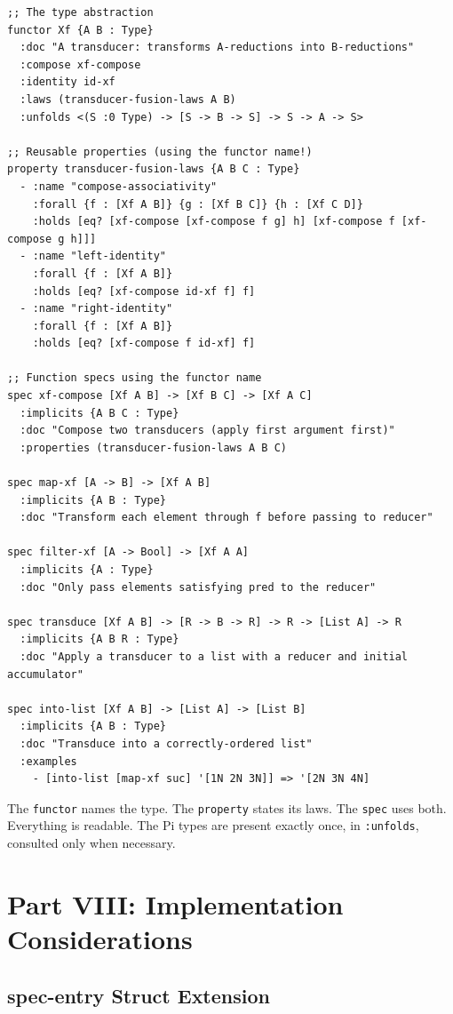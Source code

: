 \documentclass[11pt]{article}
\begin{document}
\begin{verbatim}
;; The type abstraction
functor Xf {A B : Type}
  :doc "A transducer: transforms A-reductions into B-reductions"
  :compose xf-compose
  :identity id-xf
  :laws (transducer-fusion-laws A B)
  :unfolds <(S :0 Type) -> [S -> B -> S] -> S -> A -> S>

;; Reusable properties (using the functor name!)
property transducer-fusion-laws {A B C : Type}
  - :name "compose-associativity"
    :forall {f : [Xf A B]} {g : [Xf B C]} {h : [Xf C D]}
    :holds [eq? [xf-compose [xf-compose f g] h] [xf-compose f [xf-compose g h]]]
  - :name "left-identity"
    :forall {f : [Xf A B]}
    :holds [eq? [xf-compose id-xf f] f]
  - :name "right-identity"
    :forall {f : [Xf A B]}
    :holds [eq? [xf-compose f id-xf] f]

;; Function specs using the functor name
spec xf-compose [Xf A B] -> [Xf B C] -> [Xf A C]
  :implicits {A B C : Type}
  :doc "Compose two transducers (apply first argument first)"
  :properties (transducer-fusion-laws A B C)

spec map-xf [A -> B] -> [Xf A B]
  :implicits {A B : Type}
  :doc "Transform each element through f before passing to reducer"

spec filter-xf [A -> Bool] -> [Xf A A]
  :implicits {A : Type}
  :doc "Only pass elements satisfying pred to the reducer"

spec transduce [Xf A B] -> [R -> B -> R] -> R -> [List A] -> R
  :implicits {A B R : Type}
  :doc "Apply a transducer to a list with a reducer and initial accumulator"

spec into-list [Xf A B] -> [List A] -> [List B]
  :implicits {A B : Type}
  :doc "Transduce into a correctly-ordered list"
  :examples
    - [into-list [map-xf suc] '[1N 2N 3N]] => '[2N 3N 4N]
\end{verbatim}

The \texttt{functor} names the type. The \texttt{property} states its laws. The \texttt{spec} uses
both. Everything is readable. The Pi types are present exactly once, in
\texttt{:unfolds}, consulted only when necessary.
\section{Part VIII: Implementation Considerations}
\label{sec:orgf1312d7}

\subsection{spec-entry Struct Extension}
\label{sec:org319a199}
\end{document}
